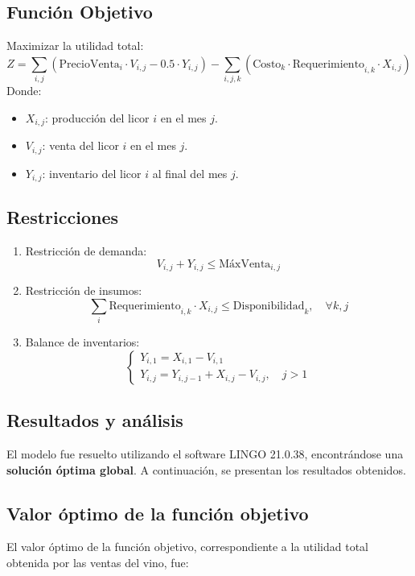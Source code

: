 \documentclass[12pt, a4paper, oneside]{book}
\theoremstyle{definition}
\begin{document}
\subsection{Función Objetivo}
Maximizar la utilidad total:
\[
Z = \sum_{i,j} (\text{PrecioVenta}_{i} \cdot V_{i,j} - 0.5 \cdot Y_{i,j}) - \sum_{i,j,k} (\text{Costo}_{k} \cdot \text{Requerimiento}_{i,k} \cdot X_{i,j})
\]
Donde:
\begin{itemize}
  \item $X_{i,j}$: producción del licor $i$ en el mes $j$.
  \item $V_{i,j}$: venta del licor $i$ en el mes $j$.
  \item $Y_{i,j}$: inventario del licor $i$ al final del mes $j$.
\end{itemize}

\subsection{Restricciones}
\begin{enumerate}
  \item Restricción de demanda:
  \[
  V_{i,j} + Y_{i,j} \leq \text{MáxVenta}_{i,j}
  \]
  
  \item Restricción de insumos:
  \[
  \sum_i \text{Requerimiento}_{i,k} \cdot X_{i,j} \leq \text{Disponibilidad}_{k}, \quad \forall k, j
  \]
  
  \item Balance de inventarios:
  \[
  \begin{cases}
  Y_{i,1} = X_{i,1} - V_{i,1} \\
  Y_{i,j} = Y_{i,j-1} + X_{i,j} - V_{i,j}, \quad j > 1
  \end{cases}
  \]
\end{enumerate}

\subsection{Resultados y análisis}

El modelo fue resuelto utilizando el software LINGO 21.0.38, encontrándose una \textbf{solución óptima global}. A continuación, se presentan los resultados obtenidos.

\subsection{Valor óptimo de la función objetivo}

El valor óptimo de la función objetivo, correspondiente a la utilidad total obtenida por las ventas del vino, fue:
\end{document}
